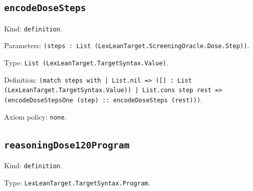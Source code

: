 \documentclass[11pt]{article}
\begin{document}
\subsection*{\texttt{encodeDoseSteps}}
\noindent Kind: \texttt{definition}.\par
\noindent Parameters: \texttt{(steps : List (LexLeanTarget.ScreeningOracle.Dose.Step))}.\par
\noindent Type: \texttt{List (LexLeanTarget.TargetSyntax.Value)}.\par
\noindent Definition: \texttt{(match steps with | List.nil => ([] : List (LexLeanTarget.TargetSyntax.Value)) | List.cons step rest => (encodeDoseStepsOne (step) :: encodeDoseSteps (rest)))}.\par
\noindent Axiom policy: \texttt{none}.\par
\subsection*{\texttt{reasoningDose120Program}}
\noindent Kind: \texttt{definition}.\par
\noindent Type: \texttt{LexLeanTarget.TargetSyntax.Program}.\par
\end{document}
